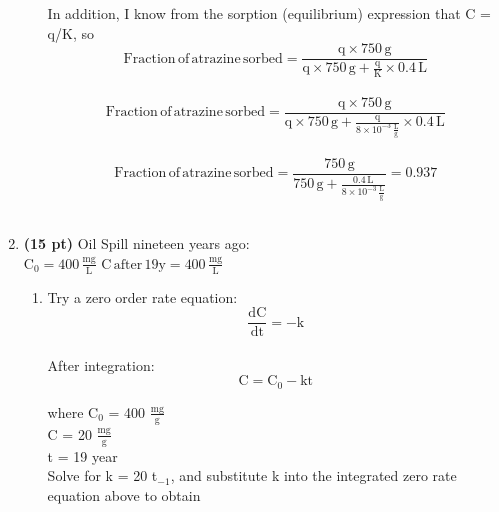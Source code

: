 \documentclass[12pt,letterpaper]{article}
\begin{document}
\begin{enumerate}
\begin{enumerate}
In addition, I know from the sorption (equilibrium) expression that C = q/K, so\\

\begin{equation*}
\mathrm{Fraction\, of\,atrazine\, sorbed = \frac{q\times 750\, g}{q\times 750\,g + \frac{q}{K}\times 0.4\, L}}
\end{equation*}\\

\begin{equation*}
\mathrm{Fraction\, of\,atrazine\, sorbed = \frac{q\times 750\, g}{q\times 750\,g + \frac{q}{8\times 10^{-3}\, \frac{L}{g}}\times 0.4\, L}}
\end{equation*}\\

\begin{equation*}
\mathrm{Fraction\, of\,atrazine\, sorbed = \frac{750\, g}{750\,g + \frac{0.4\, L}{8\times 10^{-3}\, \frac{L}{g}}} = 0.937}
\end{equation*}\\

\end{enumerate}
\vspace{0.3in}


\item \textbf{(15 pt)} Oil Spill nineteen years ago:\\

$\mathrm{C_0 = 400\, \frac{mg}{L}}$
$\mathrm{C \, after\, 19 y = 400\, \frac{mg}{L}}$
\begin{enumerate}

\item Try a zero order rate equation:
\begin{equation*}
\mathrm{\frac{dC}{dt} = -k}
\end{equation*}\\

After integration:\\

\begin{equation*}
\mathrm{C = C_0 -kt}
\end{equation*}

where C$_0$ = 400 $\mathrm{\frac{mg}{g}}$\\
C = 20 $\mathrm{\frac{mg}{g}}$\\
t = 19 year\\

Solve for k = 20 t$_{-1}$, and substitute k into the integrated zero rate equation above to obtain\\


\end{enumerate}
\end{enumerate}
\end{document}
